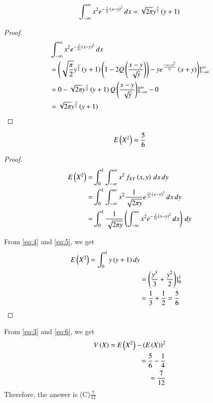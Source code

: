 \documentclass[journal,12pt,twocolumn]{IEEEtran}
\begin{document}
\begin{lemma}
\begin{align}
\int_{-\infty}^{\infty}x^2e^{-\frac{1}{2y}\left(x-y\right)^2}\,dx=\sqrt{2\pi}y^\frac{3}{2}\left(y+1\right)
\end{align}
\end{lemma} 
\begin{proof}
\begin{align}
&\int_{-\infty}^{\infty}x^2e^{-\frac{1}{2y}\left(x-y\right)^2}\,dx\\
&=\left(\sqrt{\frac{\pi}{2}}y^\frac{3}{2}\left(y+1\right)\left(1-2Q\left(\frac{x-y}{\sqrt{y}}\right)\right) - ye^\frac{-\left(x-y\right)^2}{2y}\left(x+y\right)\right)]_{-\infty}^{\infty}\\
&=0-\sqrt{2\pi}y^\frac{3}{2}\left(y+1\right)Q\left(\frac{x-y}{\sqrt{y}}\right)]_{-\infty}^{\infty} - 0\\
&=\sqrt{2\pi}y^\frac{3}{2}\left(y+1\right) \label{eq:5}
\end{align}
\end{proof}
\begin{lemma}
\begin{align}
E\left(X^2\right) = \frac{5}{6}
\end{align}
\end{lemma}
\begin{proof}
\begin{align}
 E\left(X^2\right)=&\int_{0}^{1}\int_{-\infty}^{\infty}x^2\,f_{XY}\left(x, y\right)\,dx\,dy\\   
 =&\int_{0}^{1}\int_{-\infty}^{\infty}x^2\frac{1}{\sqrt{2\pi y}}e^{\frac{-1}{2y}\left(x-y\right)^2}\,dx \,dy\\
 =&\int_{0}^{1}\frac{1}{\sqrt{2\pi y}}\left(\int_{-\infty}^{\infty}x^2e^{-\frac{1}{2y}\left(x-y\right)^2}\,dx\right)\,dy
 \label{eq:4}
\end{align}

From \eqref{eq:4} and \eqref{eq:5}, we get
\begin{align}
E\left(X^2\right) = \int_{0}^{1}y\left(y+1\right)dy\\
&=\left(\frac{y^3}{3}+\frac{y^2}{2}\right)]_{0}^{1}\\
&=\frac{1}{3}+\frac{1}{2}=\frac{5}{6} \label{eq:6}
\end{align}
\end{proof}
From \eqref{eq:3} and \eqref{eq:6}, we get
\begin{align}
V\left(X\right) = E\left(X^2\right) - \left(E\left(X\right)\right)^2\\
     = \frac{5}{6} - \frac{1}{4}\\
     = \frac{7}{12}
\end{align}
Therefore, the answer is (C)$\frac{7}{12}$
\end{document}
